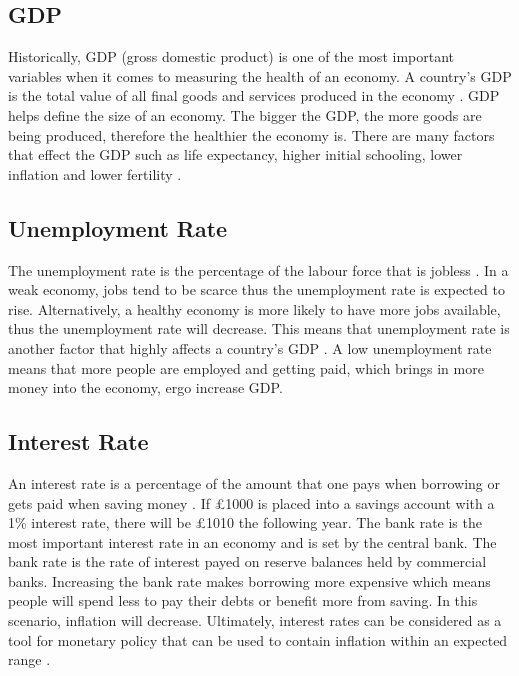 \documentclass{UoYCSproject}
\begin{document}
\subsection{GDP}
Historically, GDP (gross domestic product) is one of the most important variables when it comes to measuring the health of an economy. A country's GDP is the total value of all final goods and services produced in the economy \cite{2003economics}. GDP helps define the size of an economy. The bigger the GDP, the more goods are being produced, therefore the healthier the economy is.  There are many factors that effect the GDP such as life expectancy, higher initial schooling, lower inflation and lower fertility \cite{barro1996determinants}. 

\subsection{Unemployment Rate}

The unemployment rate is the percentage of the labour force that is jobless \cite{unemployment}. In a weak economy, jobs tend to be scarce thus the unemployment rate is expected to rise. Alternatively, a healthy economy is more likely to have more jobs available, thus the unemployment rate will decrease. This means that unemployment rate is another factor that highly affects a country's GDP \cite{bean1993unemployment}. A low unemployment rate means that more people are employed and getting paid, which brings in more money into the economy, ergo increase GDP.  

\subsection{Interest Rate}
An interest rate is a percentage of the amount that one pays when borrowing or gets paid when saving money \cite{interestrate}. If \pounds 1000 is placed into a savings account with a 1\% interest rate, there will be \pounds 1010 the following year.  The bank rate is the most important interest rate in an economy and is set by the central bank. The bank rate is the rate of interest payed on reserve balances held by commercial banks. Increasing the bank rate makes borrowing more expensive which means people will spend less to pay their debts or benefit more from saving. In this scenario, inflation will decrease. Ultimately, interest rates can be considered as a tool for monetary policy that can be used to contain inflation within an expected range \cite{christiano1999monetary}. 
\end{document}
